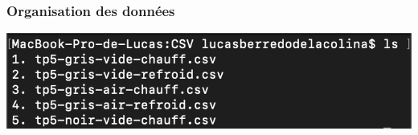 \documentclass{beamer}
\begin{document}
\begin{frame}
\frametitle{Organisation des données}

\centering
\begin{minipage}{0.48\textwidth}
    \centering
    \includegraphics[width=\linewidth]{Fig/ls-csv.png}
\end{minipage}
\hfill
\begin{minipage}{0.48\textwidth}
    \centering
\end{minipage}
\end{frame}





\begin{frame}


\end{frame}
\end{document}
